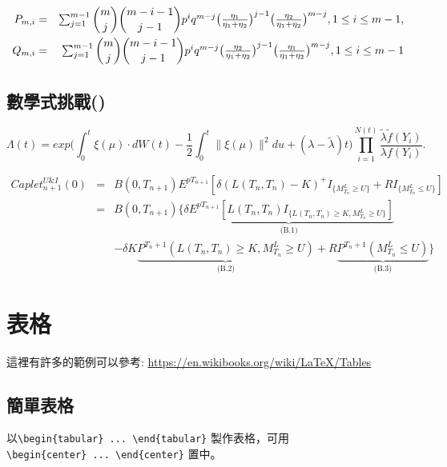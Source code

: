 \begin{align}
P_{m, i} & = &
\begin{matrix} \sum_{j = 1}^{m - 1} \dbinom{m}{j} \dbinom{m - i - 1}{j - 1} p^i q^{m - j} \big( \frac{\eta_1}{\eta_1 + \eta_2}\big)^{j - 1} \big( \frac{\eta_2}{\eta_1 + \eta_2}\big)^{m - j}, 1 \leq i \leq m - 1, \nonumber
\end{matrix}\\
Q_{m, i} & = &
\begin{matrix} \sum_{j = 1}^{m - 1} \dbinom{m}{j} \dbinom{m - i - 1}{j - 1} p^i q^{m - j} \big( \frac{\eta_2}{\eta_1 + \eta_2}\big)^{j - 1} \big( \frac{\eta_1}{\eta_1 + \eta_2}\big)^{m - j}, 1 \leq i \leq m - 1 \nonumber
\end{matrix}
\end{align}\bigskip

\subsection{數學式挑戰(\uppercase\expandafter{})}
$$
\Lambda(t) = exp \bigg(\int_{0}^{t} \xi(\mu)\cdot dW(t) - \frac{1}{2} \int_{0}^{t} \lVert \xi(\mu) \lVert ^2 du + (\lambda - \tilde{\lambda})t \bigg) \prod_{i = 1}^{N(t)} \frac{\tilde{\lambda}\tilde{f}(Y_i)}{\lambda f(Y_i)}.
$$

\begin{eqnarray}
Caplet_{n+1}^{U \& I}(0) & = & B(0, T_{n+1})E^{pT_{n+1}}[\delta(L(T_n, T_n) - K)^{+}I_{\{M_{T_n}^{L}\geq U\}} + RI_{\{M_{T_n}^{L}\leq U\}}]\nonumber\\
& = & B(0, T_{n+1})\bigg\{\underbrace{\delta E^{pT_{n+1}}[L(T_n, T_n)I_{\{L(T_n, T_n)\geq K,M_{T_n}^{L}\geq U\}}]}_{\text{(B.1)}}\nonumber\\
& & -\delta K \underbrace{P^{T_n + 1}(L(T_n, T_n) \geq K, M_{T_n}^{L} \geq U)}_{\text{(B.2)}} + R \underbrace{P^{T_n + 1}(M_{T_n}^{L} \leq U)}_{\text{(B.3)}}\bigg\}\nonumber
\end{eqnarray}
\section{表格}
這裡有許多的範例可以參考: \url{https://en.wikibooks.org/wiki/LaTeX/Tables}

\subsection{簡單表格}
以\verb|\begin{tabular} ... \end{tabular}| 製作表格，可用\\
\verb|\begin{center} ... \end{center}| 置中。\\

